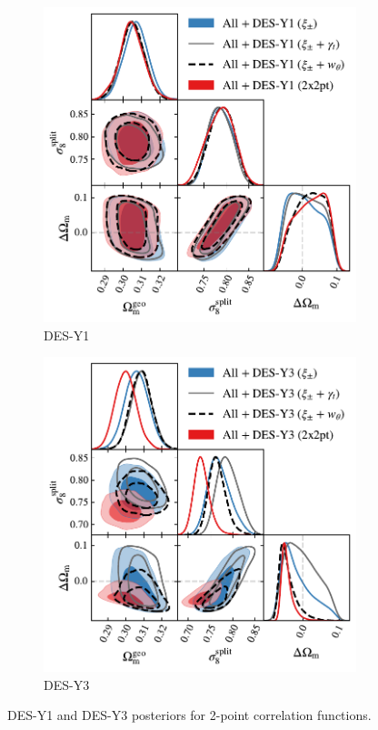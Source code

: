 \begin{figure}[ht]
	\centering
	\begin{subfigure}[b]{0.45\textwidth}
		\includegraphics[width=\textwidth]{plots/plot208_v3.pdf}
		\caption{DES-Y1}
		\label{fig:y1_2x2_lcdm}
	\end{subfigure}
	\begin{subfigure}[b]{0.45\textwidth}
		\includegraphics[width=\textwidth]{plots/plot208_v2.pdf}
		\caption{DES-Y3}
		\label{fig:y3_2x2_lcdm}
	\end{subfigure}
	\caption{DES-Y1 and DES-Y3 posteriors for 2-point correlation functions.}
	\label{fig:y3_2x2}
\end{figure}

